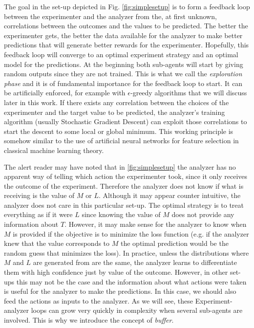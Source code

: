 \documentclass[11pt,a4paper,twoside]{report}
\newcommand{\+}{\textnormal{+} }
\theoremstyle{definition}
\numberwithin{equation}{chapter}
\begin{document}
The goal in the set-up depicted in Fig. \ref{fig:simplesetup} is to form a
feedback loop between the experimenter and the analyzer from the, at first
unknown, correlations between the outcomes and the values to be predicted. The
better the experimenter gets, the better the data available for the analyzer to
make better predictions that will generate better rewards for the experimenter.
Hopefully, this feedback loop will converge to an optimal experiment strategy
and an optimal model for the predictions. At the beginning both sub-agents will
start by giving random outputs since they are not trained. This is what we call
the \textit{exploration phase} and it is of fundamental importance for the
feedback loop to start. It can be artificially enforced, for example with
$\epsilon$-greedy algorithms that we will discuss later in this work. If there
exists any correlation between the choices of the experimenter and the target
value to be predicted, the analyzer's training algorithm (usually Stochastic
Gradient Descent) can exploit those correlations to start the descent to some
local or global minimum. This working principle is somehow similar to the use of
artificial neural networks for feature selection in classical machine learning
theory.

The alert reader may have noted that in \ref{fig:simplesetup} the analyzer has
no apparent way of telling which action the experimenter took, since it only
receives the outcome of the experiment. Therefore the analyzer does not know if
what is receiving is the value of $M$ or $L$. Although it may appear counter
intuitive, the analyzer does not care in this particular set-up. The optimal
strategy is to treat everything as if it were $L$ since knowing the value of $M$
does not provide any information about $T$. However, it may make sense for the
analyzer to know when $M$ is provided if the objective is to minimize the loss
function (e.g. if the analyzer knew that the value corresponds to $M$ the
optimal prediction would be the random guess that minimizes the loss). In
practice, unless the distributions where $M$ and $L$ are generated from are the
same, the analyzer learns to differentiate them with high confidence just by
value of the outcome. However, in other set-ups this may not be the case and the
information about what actions were taken is useful for the analyzer to make the
predictions. In this case, we should also feed the actions as inputs to the
analyzer. As we will see, these Experiment-analyzer loops can grow very quickly
in complexity when several sub-agents are involved. This is why we introduce the
concept of \textit{buffer}.
\end{document}
